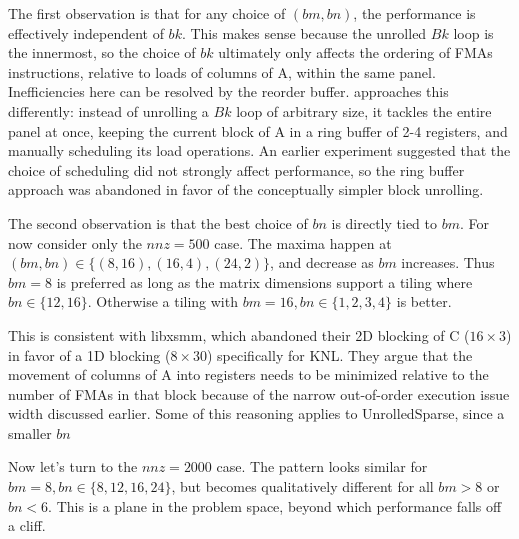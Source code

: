 The first observation is that for any choice of $(bm, bn)$, the performance is effectively independent of $bk$. This makes sense because the unrolled $Bk$ loop is the innermost, so the choice of $bk$ ultimately only affects the ordering of \glspl{FMA} instructions, relative to loads of columns of A, within the same panel. Inefficiencies here can be resolved by the reorder buffer.  approaches this differently: instead of unrolling a $Bk$ loop of arbitrary size, it tackles the entire panel at once, keeping the current block of A in a ring buffer of 2-4 registers, and manually scheduling its load operations. An earlier experiment suggested that the choice of scheduling did not strongly affect performance, so the ring buffer approach was abandoned in favor of the conceptually simpler block unrolling.

The second observation is that the best choice of $bn$ is directly tied to $bm$. For now consider only the $nnz=500$ case. The maxima happen at $(bm,bn) \in \{(8,16), (16,4), (24,2)\}$, and decrease as $bm$ increases. Thus $bm=8$ is preferred as long as the matrix dimensions support a tiling where $bn \in \{12,16\}$. Otherwise a tiling with $bm=16, bn\in\{1,2,3,4\}$ is better. 

This is consistent with libxsmm, which abandoned their 2D blocking of C ($16 \times 3$) in favor of a 1D blocking ($8 \times 30$) specifically for \gls{KNL}. They argue that the movement of columns of A into registers needs to be minimized relative to the number of FMAs in that block because of the narrow out-of-order execution issue width discussed earlier. Some of this reasoning applies to UnrolledSparse, since a smaller $bn$ 

Now let's turn to the $nnz=2000$ case. The pattern looks similar for $bm=8, bn\in\{8,12,16,24\}$, but becomes qualitatively different for all $bm > 8$ or $bn < 6$. This is a plane in the problem space, beyond which performance falls off a cliff. 


